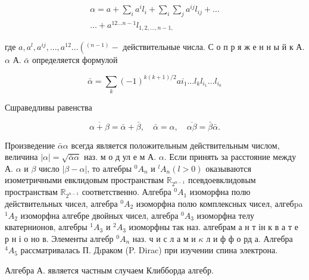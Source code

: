 \documentclass[10pt]{article}
\begin{document}
\[

\begin{gathered}

\alpha=a+\sum_{i} a^{i} l_{i}+\sum_{i} \sum_{j} a^{i j} l_{i j}+\ldots \\

\ldots+a^{12 \ldots n-1} l_{1,2, \ldots, n-1,}

\end{gathered}

\]



где $a, a^{l}, a^{i j}, \ldots, a^{12} \ldots\left(^{(n-1)}-\right.$ действительные числа. С о п р я ж е н н ы й к А. $\alpha$ А. $\bar{\alpha}$ определяется формулой



\[

\bar{\alpha}=\sum_{k}(-1)^{k(k+1) / 2} a i_{1} \ldots l_{k} l_{i_{1}} \ldots l_{i_{k}}

\]



Сшраведливы равенства



\[

\overline{\alpha+\beta}=\bar{\alpha}+\bar{\beta}, \quad \bar{\alpha}=\alpha, \quad \overline{\alpha \beta}=\bar{\beta} \bar{\alpha} .

\]



Произведение $\bar{\alpha} \alpha$ всегда является положительным действительным числом, величина $|\alpha|=\sqrt{\bar{\alpha} \alpha}$ наз. м о д ул е м А. $\alpha$. Если принять за расстояние между А. $\alpha$ и $\beta$ число $|\beta-\alpha|$, то алгебры ${ }^{0} A_{n}$ и ${ }^{l} A_{n}(l>0)$ оказываются изометричными евклидовым пространствам $\mathbb{R}_{2^{n-1}}$ псевдоевклидовым пространствам $\mathbb{R}_{2^{n-1}}$ соответственно. Алгебра ${ }^{0} A_{1}$ изоморфна полю действительных чисел, алгебра ${ }^{0} A_{2}$ изоморфна полю комплексных чисел, алгебpa ${ }^{1} A_{2}$ изоморфна алгебре двойных чисел, алгебра ${ }^{0} A_{3}$ изоморфна телу кватернионов, алгебры ${ }^{1} A_{3}$ и ${ }^{2} A_{3}$ изоморфны так наз. алгебрам а н т ін к в а т е р н і о но в. Элементы алгебр ${ }^{0} A_{n}$ наз. ч и с л а м и $\kappa$ л и ф ф о рд а. Алгебра ${ }^{4} A_{5}$ рассматривалась П. Дıраком (P. Dirac) при изучении спина электрона.



Алгебра А. является частным случаем Клибборда алгебр.
\end{document}
